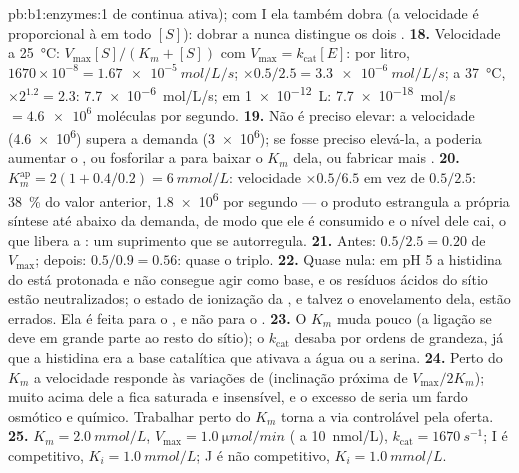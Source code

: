 \begin{solution}{pb:b1:enzymes:1}
de  continua ativa); com I ela também dobra (a velocidade é
proporcional à  em todo $[S]$): dobrar a  nunca distingue os
dois .
\textbf{18.} Velocidade a \qty{25}{\celsius}: $V_{\max}[S]/(K_m + [S])$
com $V_{\max} = k_{\text{cat}}[E]$: por litro, $1670\times 10^{-8} =
\qty{1.67e-5}{mol/L/s}$; $\times 0.5/2.5 = \qty{3.3e-6}{mol/L/s}$; a
\qty{37}{\celsius}, $\times 2^{1.2} = 2.3$: \qty{7.7e-6}{mol/L/s}; em
\qty{1e-12}{L}: \qty{7.7e-18}{mol/s} $= \num{4.6e6}$ moléculas por
segundo.
\textbf{19.} Não é preciso elevar: a velocidade (\num{4.6e6}) supera a
demanda (\num{3e6}); se fosse preciso elevá-la, a  poderia
aumentar o , ou fosforilar a  para baixar o $K_m$ dela,
ou fabricar mais .
\textbf{20.} $K_m^{\text{ap}} = 2(1 + 0.4/0.2) = \qty{6}{mmol/L}$:
velocidade $\times 0.5/6.5$ em vez de $0.5/2.5$: \qty{38}{\%} do valor
anterior, \num{1.8e6} por segundo --- o produto estrangula a própria
síntese até abaixo da demanda, de modo que ele é consumido e o nível
dele cai, o que libera a : um suprimento que se autorregula.
\textbf{21.} Antes: $0.5/2.5 = 0.20$ de $V_{\max}$; depois: $0.5/0.9 =
0.56$: quase o triplo.
\textbf{22.} Quase nula: em pH 5 a histidina do  está
protonada e não consegue agir como base, e os resíduos ácidos do sítio
estão neutralizados; o estado de ionização da , e talvez o
enovelamento dela, estão errados. Ela é feita para o , e não para
o .
\textbf{23.} O $K_m$ muda pouco (a ligação se deve em grande parte ao
resto do sítio); o $k_{\text{cat}}$ desaba por ordens de grandeza, já
que a histidina era a base catalítica que ativava a água ou a serina.
\textbf{24.} Perto do $K_m$ a velocidade responde às variações de
 (inclinação próxima de $V_{\max}/2K_m$); muito acima dele a
 fica saturada e insensível, e o excesso de  seria um
fardo osmótico e químico. Trabalhar perto do $K_m$ torna a via
controlável pela oferta.
\textbf{25.} $K_m = \qty{2.0}{mmol/L}$, $V_{\max} = \qty{1.0}{\micro mol/min}$
( a \qty{10}{nmol/L}), $k_{\text{cat}} = \qty{1670}{s^{-1}}$; I é
competitivo, $K_i = \qty{1.0}{mmol/L}$; J é não competitivo, $K_i =
\qty{1.0}{mmol/L}$.
\end{solution}
